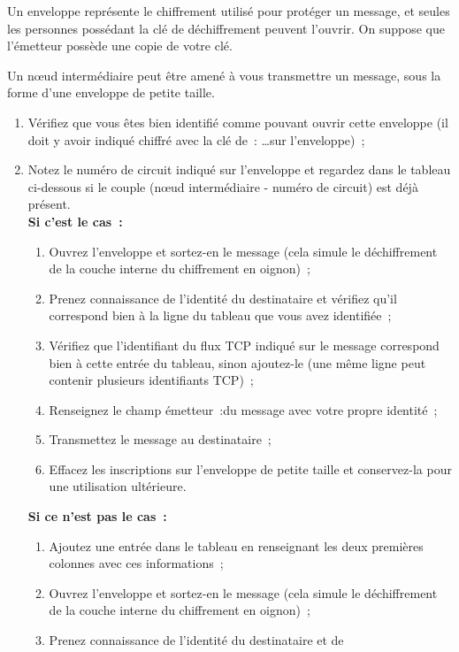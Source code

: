 \documentclass[a4paper,twoside,french]{article}
\begin{document}
  Un enveloppe représente le chiffrement utilisé pour protéger un
  message, et seules les personnes possédant la clé de déchiffrement
  peuvent l'ouvrir. On suppose que l'émetteur possède une copie de
  votre clé.

  Un n\oe ud intermédiaire peut être amené à vous transmettre un
  message, sous la forme d'une enveloppe de petite taille.

  \begin{enumerate}
  \item Vérifiez que vous êtes bien identifié comme pouvant ouvrir
    cette enveloppe (il doit y avoir indiqué \og chiffré avec la clé
    de~: \ldots\fg sur l'enveloppe)~;
  \item Notez le numéro de circuit indiqué sur l'enveloppe et regardez
    dans le tableau ci-dessous si le couple (n\oe ud intermédiaire -
    numéro de circuit) est déjà présent.\\
    \textbf{Si c'est le cas~:}
    \begin{enumerate}
    \item Ouvrez l'enveloppe et sortez-en le message (cela simule le
      déchiffrement de la couche interne du chiffrement en oignon)~;
    \item Prenez connaissance de l'identité du destinataire et
      vérifiez qu'il correspond bien à la ligne du tableau que vous
      avez identifiée~;
    \item Vérifiez que l'identifiant du flux TCP indiqué sur le
      message correspond bien à cette entrée du tableau, sinon
      ajoutez-le (une même ligne peut contenir plusieurs identifiants
      TCP)~;
    \item Renseignez le champ \og émetteur~:\fg du message avec votre
      propre identité~;
    \item Transmettez le message au destinataire~;
    \item Effacez les inscriptions sur l'enveloppe de petite taille et
      conservez-la pour une utilisation ultérieure.
    \end{enumerate}
    \textbf{Si ce n'est pas le cas~:}
    \begin{enumerate}
    \item Ajoutez une entrée dans le tableau en renseignant les deux
      premières colonnes avec ces informations~;
    \item Ouvrez l'enveloppe et sortez-en le message (cela simule le
      déchiffrement de la couche interne du chiffrement en oignon)~;
    \item Prenez connaissance de l'identité du destinataire et de

\end{enumerate}
\end{enumerate}
\end{document}
